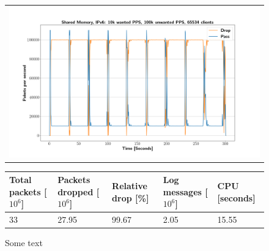 \begin{figure}[!h]
	\label{fig:simplefail2ban:shm:ip6:100k}
	\centering
	\scriptsize
	\begin{tabular}{c}
    	\centerline{\includegraphics[width=1.2\textwidth]{images/simplefail2ban_shm_ipv6_v10k_iv100k_c65534.png}}
	\end{tabular}
	\begin{tabular}{lllll}
		\toprule
		\textbf{Total packets [$10^6$]} & \textbf{Packets dropped [$10^6$]} & \textbf{Relative drop [\%]} & \textbf{Log messages [$10^6$]} & \textbf{CPU [seconds]} \\ \midrule 
		33 & 27.95 & 99.67 & 2.05 & 15.55 \\
		\bottomrule
	\end{tabular}
	\caption[Simplefail2ban, Shared Memory, IPv6, 100k \ac{PPS}]{Some text}
\end{figure}

